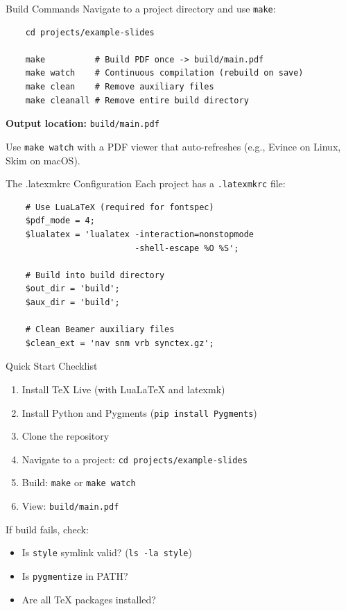 \begin{frame}[fragile]{Build Commands}
  Navigate to a project directory and use \verb|make|:
  \begin{verbatim}
    cd projects/example-slides

    make          # Build PDF once -> build/main.pdf
    make watch    # Continuous compilation (rebuild on save)
    make clean    # Remove auxiliary files
    make cleanall # Remove entire build directory
  \end{verbatim}

  \vspace{0.3cm}
  \textbf{Output location:} \verb|build/main.pdf|

  \vspace{0.3cm}
  \begin{sqt:tip}
    Use \texttt{make watch} with a PDF viewer that auto-refreshes
    (e.g., Evince on Linux, Skim on macOS).
  \end{sqt:tip}
\end{frame}

\begin{frame}[fragile]{The .latexmkrc Configuration}
  Each project has a \verb|.latexmkrc| file:
  \begin{verbatim}
    # Use LuaLaTeX (required for fontspec)
    $pdf_mode = 4;
    $lualatex = 'lualatex -interaction=nonstopmode
                          -shell-escape %O %S';

    # Build into build directory
    $out_dir = 'build';
    $aux_dir = 'build';

    # Clean Beamer auxiliary files
    $clean_ext = 'nav snm vrb synctex.gz';
  \end{verbatim}
\end{frame}

\begin{frame}{Quick Start Checklist}
  \begin{enumerate}
    \item Install TeX Live (with LuaLaTeX and latexmk)
    \item Install Python and Pygments (\texttt{pip install Pygments})
    \item Clone the repository
    \item Navigate to a project: \texttt{cd projects/example-slides}
    \item Build: \texttt{make} or \texttt{make watch}
    \item View: \texttt{build/main.pdf}
  \end{enumerate}

  \vspace{0.5cm}
  \begin{sqt:definition}[Troubleshooting]
    If build fails, check:
    \begin{itemize}
      \item Is \texttt{style} symlink valid? (\texttt{ls -la style})
      \item Is \texttt{pygmentize} in PATH?
      \item Are all TeX packages installed?
    \end{itemize}
  \end{sqt:definition}
\end{frame}


